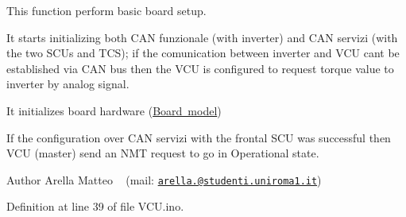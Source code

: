 This function perform basic board setup. 


\begin{DoxyItemize}
\item It starts initializing both C\+AN funzionale (with inverter) and C\+AN servizi (with the two S\+C\+Us and T\+CS); if the comunication between inverter and V\+CU can\textquotesingle{}t be established via C\+AN bus then the V\+CU is configured to request torque value to inverter by analog signal.
\item It initializes board hardware (\mbox{\hyperlink{group___board__model__group}{Board model}})
\item If the configuration over C\+AN servizi with the frontal S\+CU was successful then V\+CU (master) send an N\+MT request to go in \textquotesingle{}Operational\textquotesingle{} state. \begin{DoxyAuthor}{Author}
Arella Matteo ~\newline
 (mail\+: \href{mailto:arella.1646983@studenti.uniroma1.it}{\tt arella.@studenti.\+uniroma1.\+it}) 
\end{DoxyAuthor}

\end{DoxyItemize}

Definition at line 39 of file V\+C\+U.\+ino.

